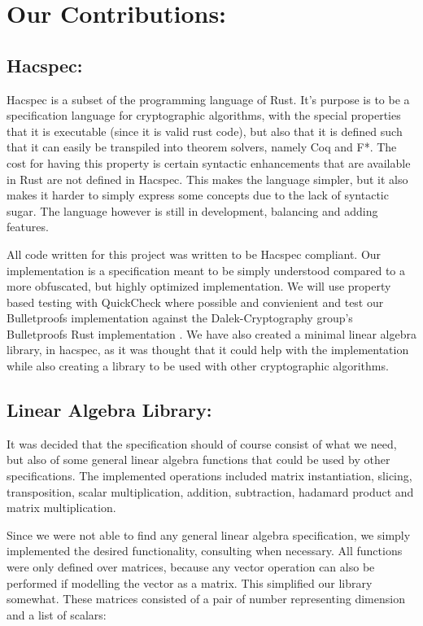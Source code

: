 \documentclass{article}
\begin{document}

\section{Our Contributions:}

\subsection{Hacspec:} \label{Hacspec}

Hacspec is a subset of the programming language of Rust. It's purpose is
to be a specification language for cryptographic algorithms, with the
special properties that it is executable (since it is valid rust code),
but also that it is defined such that it can easily be transpiled
into theorem solvers, namely Coq and F*. The cost for having this
property is certain syntactic enhancements that are available in Rust
are not defined in Hacspec. This makes the language simpler, but it
also makes it harder to simply express some concepts due to the lack
of syntactic sugar. The language however is still in development,
balancing and adding features.

All code written for this project was written to be Hacspec
compliant. Our implementation is a specification meant to be simply
understood compared to a more obfuscated, but highly optimized
implementation. We will use property based testing with QuickCheck
\cite{quickcheck} where possible and convienient and test our
Bulletproofs implementation against the Dalek-Cryptography group's
Bulletproofs Rust implementation \cite{dalek}. We have also created
a minimal linear algebra library, in hacspec, as it was thought that
it could help with the implementation while also creating a library
to be used with other cryptographic algorithms.

\subsection{Linear Algebra Library:}
It was decided that the specification should of course consist of what
we need, but also of some general linear algebra functions that could
be used by other specifications. The implemented operations included
matrix instantiation, slicing, transposition, scalar multiplication,
addition, subtraction, hadamard product and matrix multiplication.

Since we were not able to find any general linear algebra
specification, we simply implemented the desired functionality,
consulting \cite{linear-algebra} when necessary. All functions were
only defined over matrices, because any vector operation can also
be performed if modelling the vector as a matrix. This simplified
our library somewhat. These matrices consisted of a pair of number
representing dimension and a list of scalars:
\end{document}
